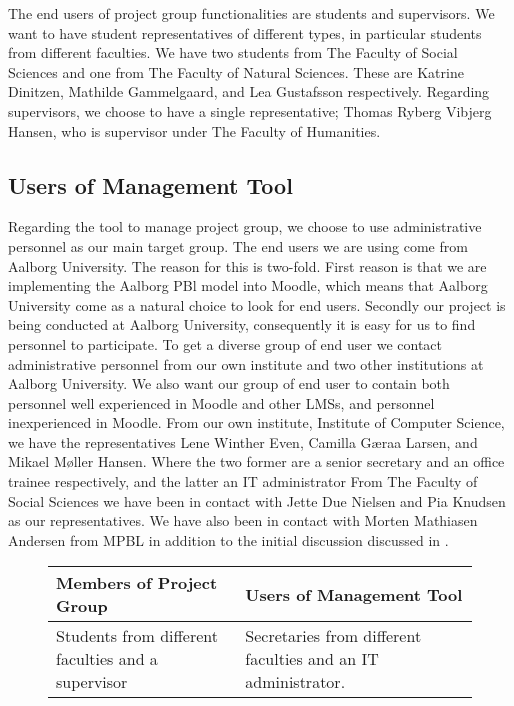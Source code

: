 The end users of project group functionalities are students and supervisors.
We want to have student representatives of different types, in particular students from different faculties.
We have two students from The Faculty of Social Sciences and one from The Faculty of Natural Sciences.
These are Katrine Dinitzen, Mathilde Gammelgaard, and Lea Gustafsson respectively.
Regarding supervisors, we choose to have a single representative; Thomas Ryberg Vibjerg Hansen, who is supervisor under The Faculty of Humanities.

\subsection{Users of Management Tool}
\label{sub:enduserstool}
Regarding the tool to manage project group, we choose to use administrative personnel as our main target group.
The end users we are using come from Aalborg University.
The reason for this is two-fold.
First reason is that we are implementing the Aalborg PBl model into Moodle, which means that Aalborg University come as a natural choice to look for end users.
Secondly our project is being conducted at Aalborg University, consequently it is easy for us to find personnel to participate.
To get a diverse group of end user we contact administrative personnel from our own institute and two other institutions at Aalborg University.
We also want our group of end user to contain both personnel well experienced in Moodle and other LMSs, and personnel inexperienced in Moodle.
From our own institute, Institute of Computer Science, we have the representatives Lene Winther Even, Camilla G\ae{}raa Larsen, and Mikael M\o{}ller Hansen.
Where the two former are a senior secretary and an office trainee respectively, and the latter an IT administrator
From The Faculty of Social Sciences we have been in contact with  Jette Due Nielsen and Pia Knudsen as our representatives.
We have also been in contact with Morten Mathiasen Andersen from MPBL in addition to the initial discussion discussed in .


\begin{figure}
	\centering
		\begin{tabular}{|p{}|p{}|}
			\hline
			\textbf{Members of Project Group} & \textbf{Users of Management Tool}\\
			\hline
			Students from different faculties and a supervisor & Secretaries from different faculties and an IT administrator.\\
			\hline
		\end{tabular}
	\label{fig:endusers}
\end{figure}
